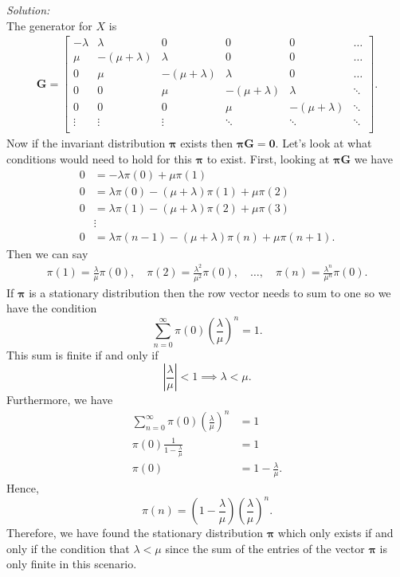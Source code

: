 \documentclass[10pt]{amsart}
\begin{document}
\noindent
\textit{Solution:} \\
The generator for $X$ is
\begin{align*}
\bm G = 
\begin{bmatrix}
- \lambda & \lambda & 0 & 0 & 0 & \dots \\
\mu & - (\mu + \lambda) & \lambda & 0 & 0 & \dots \\
0 & \mu & - (\mu + \lambda) & \lambda & 0 & \dots \\
0 & 0 & \mu & - (\mu + \lambda) & \lambda & \ddots \\
0 & 0 & 0 & \mu & - (\mu + \lambda) & \ddots \\
\vdots & \vdots & \vdots & \ddots & \ddots & \ddots \\
\end{bmatrix}.
\end{align*}
Now if the invariant distribution $\bm \pi$ exists then $ \bm \pi \bm G = \bm 0$.
Let's look at what conditions would need to hold for this $\bm \pi$ to exist.
First, looking at $\bm \pi \bm G$ we have
\begin{align*}
0 &= - \lambda \pi(0) + \mu \pi(1) \\
0 &= \lambda \pi(0) - (\mu + \lambda) \pi(1) + \mu \pi(2) \\
0 &= \lambda \pi(1) - (\mu + \lambda) \pi(2) + \mu \pi(3) \\
& \vdots \\
0 &= \lambda \pi(n - 1) - (\mu + \lambda) \pi(n) + \mu \pi(n + 1).
\end{align*}
Then we can say
\begin{align*}
\pi(1) = \frac {\lambda}{\mu }\pi(0), \quad
\pi(2) = \frac {\lambda^2}{\mu^2 }\pi(0), \quad \dots, \quad
\pi(n) = \frac {\lambda^n}{\mu^n }\pi(0).
\end{align*}
If $\bm \pi$ is a stationary distribution then the row vector needs to sum to one so we have the condition
$$
\sum_{n=0}^{\infty} \pi(0) \left(\frac {\lambda}{\mu}\right)^n = 1.
$$
This sum is finite if and only if
$$
\left| \frac \lambda \mu \right| < 1 \implies \lambda < \mu.
$$
Furthermore, we have
\begin{align*}
\sum_{n=0}^{\infty} \pi(0) \left(\frac {\lambda}{\mu}\right)^n &= 1 \\
\pi(0) \frac 1 {1 - \frac \lambda \mu} &= 1 \\
\pi(0) &= 1 - \frac \lambda \mu.
\end{align*}
Hence,
$$
\pi(n) = \left( 1 - \frac \lambda \mu \right) \left(\frac {\lambda}{\mu}\right)^n.
$$
Therefore, we have found the stationary distribution $\bm \pi$ which only exists if and only if the condition that $\lambda < \mu$ since the sum of the entries of the vector $\bm \pi$ is only finite in this scenario. \\
\end{document}
